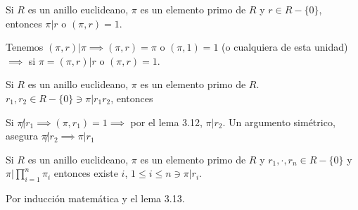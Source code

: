 \begin{prop}
    Si $R$ es un anillo euclideano, $\pi$ es un elemento primo de $R$ y $r\in R-\{0\}$, entonces $\pi|r$ o $(\pi,r)=1$. 
    \begin{dem}
        Tenemos $(\pi,r)|\pi\implies (\pi,r)=\pi$ o $(\pi,1)=1$ (o cualquiera de esta unidad) $\implies$ si $\pi=(\pi,r)|r$ o $(\pi,r)=1$.
    \end{dem}
\end{prop}

\begin{lema}[3.13]
    Si $R$ es un anillo euclideano, $\pi$ es un elemento primo de $R$. $r_1,r_2\in R-\{0\}\ni \pi |r_1r_2$, entonces 
    \begin{dem}
        Si $\pi\not| r_1\implies (\pi, r_1)=1\implies$ por el lema 3.12, $\pi |r_2$. Un argumento simétrico, asegura $\pi\not | r_2\implies \pi |r_1$
    \end{dem}
\end{lema}

\begin{corolario}
    Si $R$ es un anillo euclideano, $\pi$ es un elemento primo de $R$ y $r_1,\cdot, r_n\in R-\{0\}$ y $\pi | \prod_{i=1}^n \pi_i$ entonces existe $i$, $1\leq i\leq n\ni \pi|r_i$.
    \begin{dem}
        Por inducción matemática y el lema 3.13.
    \end{dem}
\end{corolario}

